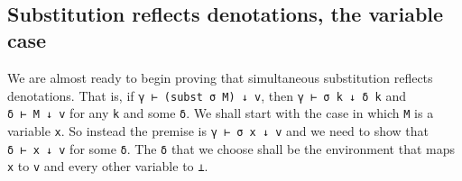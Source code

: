 \begin{fence}
\begin{code}%
\>[0]\AgdaSpace{}%
\AgdaSymbol{:}\AgdaSpace{}%
\AgdaSpace{}%
\AgdaSymbol{\{}\AgdaSpace{}%
\AgdaSpace{}%
\AgdaSymbol{\}}\AgdaSpace{}%
\AgdaSymbol{\{}\AgdaSpace{}%
\AgdaSymbol{:}\AgdaSpace{}%
\AgdaSpace{}%
\AgdaSymbol{\}}\AgdaSpace{}%
\AgdaSymbol{\{}\AgdaSpace{}%
\AgdaSpace{}%
\AgdaSymbol{:}\AgdaSpace{}%
\AgdaSpace{}%
\AgdaSpace{}%
\AgdaSymbol{\}}\<%
\\
\>[0][@{}l@{\AgdaIndent{0}}]%
\>[2]%
\>[678I]\AgdaSymbol{(}\AgdaSpace{}%
\AgdaSpace{}%
\AgdaSymbol{)}\AgdaSpace{}%
\AgdaSpace{}%
\AgdaSpace{}%
\AgdaSpace{}%
\AgdaSpace{}%
\AgdaSpace{}%
\<%
\\
\>[.][@{}l@{}]\<[678I]%
\>[4]\AgdaComment{----------------------------}\<%
\\
%
\>[2]\AgdaSpace{}%
\AgdaSpace{}%
\AgdaSpace{}%
\AgdaSpace{}%
\AgdaSpace{}%
\<%
\\
\>[0]\AgdaSpace{}%
\AgdaSpace{}%
\AgdaSymbol{=}\AgdaSpace{}%
\AgdaSpace{}%
\AgdaSpace{}%
\<%
\end{code}
\end{fence}

\hypertarget{substitution-reflects-denotations-the-variable-case}{%
\subsection{Substitution reflects denotations, the variable
case}\label{substitution-reflects-denotations-the-variable-case}}

We are almost ready to begin proving that simultaneous substitution
reflects denotations. That is, if \texttt{γ\ ⊢\ (subst\ σ\ M)\ ↓\ v},
then \texttt{γ\ ⊢\ σ\ k\ ↓\ δ\ k} and \texttt{δ\ ⊢\ M\ ↓\ v} for any
\texttt{k} and some \texttt{δ}. We shall start with the case in which
\texttt{M} is a variable \texttt{x}. So instead the premise is
\texttt{γ\ ⊢\ σ\ x\ ↓\ v} and we need to show that
\texttt{δ\ ⊢\ x\ ↓\ v} for some \texttt{δ}. The \texttt{δ} that we
choose shall be the environment that maps \texttt{x} to \texttt{v} and
every other variable to \texttt{⊥}.

